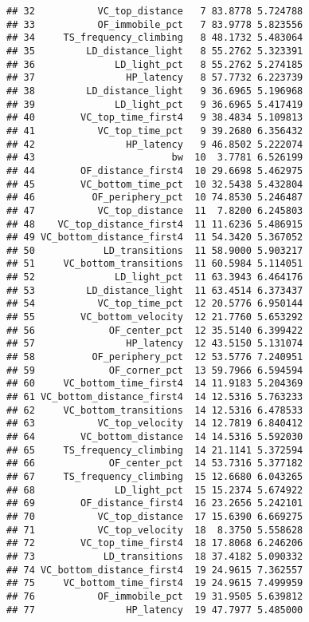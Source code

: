 \documentclass{book}
\begin{document}
\begin{verbatim}
## 32           VC_top_distance   7 83.8778 5.724788
## 33           OF_immobile_pct   7 83.9778 5.823556
## 34     TS_frequency_climbing   8 48.1732 5.483064
## 35         LD_distance_light   8 55.2762 5.323391
## 36              LD_light_pct   8 55.2762 5.274185
## 37                HP_latency   8 57.7732 6.223739
## 38         LD_distance_light   9 36.6965 5.196968
## 39              LD_light_pct   9 36.6965 5.417419
## 40        VC_top_time_first4   9 38.4834 5.109813
## 41           VC_top_time_pct   9 39.2680 6.356432
## 42                HP_latency   9 46.8502 5.222074
## 43                        bw  10  3.7781 6.526199
## 44        OF_distance_first4  10 29.6698 5.462975
## 45        VC_bottom_time_pct  10 32.5438 5.432804
## 46          OF_periphery_pct  10 74.8530 5.246487
## 47           VC_top_distance  11  7.8200 6.245803
## 48    VC_top_distance_first4  11 11.6236 5.486915
## 49 VC_bottom_distance_first4  11 54.3420 5.367052
## 50            LD_transitions  11 58.9000 5.903217
## 51     VC_bottom_transitions  11 60.5984 5.114051
## 52              LD_light_pct  11 63.3943 6.464176
## 53         LD_distance_light  11 63.4514 6.373437
## 54           VC_top_time_pct  12 20.5776 6.950144
## 55        VC_bottom_velocity  12 21.7760 5.653292
## 56             OF_center_pct  12 35.5140 6.399422
## 57                HP_latency  12 43.5150 5.131074
## 58          OF_periphery_pct  12 53.5776 7.240951
## 59             OF_corner_pct  13 59.7966 6.594594
## 60     VC_bottom_time_first4  14 11.9183 5.204369
## 61 VC_bottom_distance_first4  14 12.5316 5.763233
## 62     VC_bottom_transitions  14 12.5316 6.478533
## 63           VC_top_velocity  14 12.7819 6.840412
## 64        VC_bottom_distance  14 14.5316 5.592030
## 65     TS_frequency_climbing  14 21.1141 5.372594
## 66             OF_center_pct  14 53.7316 5.377182
## 67     TS_frequency_climbing  15 12.6680 6.043265
## 68              LD_light_pct  15 15.2374 5.674922
## 69        OF_distance_first4  16 23.2656 5.242101
## 70           VC_top_distance  17 15.6390 6.669275
## 71           VC_top_velocity  18  8.3750 5.558628
## 72        VC_top_time_first4  18 17.8068 6.246206
## 73            LD_transitions  18 37.4182 5.090332
## 74 VC_bottom_distance_first4  19 24.9615 7.362557
## 75     VC_bottom_time_first4  19 24.9615 7.499959
## 76           OF_immobile_pct  19 31.9505 5.639812
## 77                HP_latency  19 47.7977 5.485000
\end{verbatim}
\end{document}
